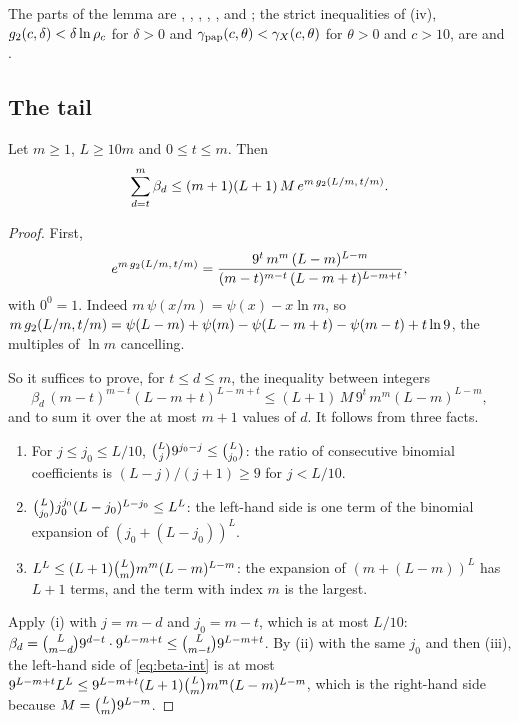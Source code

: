 The parts of the lemma are ,
, ,
, ,  and
; the strict inequalities of (iv), \(g_{2}(c,\delta)<\delta\ln\rho_c\)
for \(\delta>0\) and \(\gamma_{\mathrm{pap}}(c,\theta)<\gamma_{X}(c,\theta)\) for \(\theta>0\) and
\(c>10\), are  and .

\subsection{The tail}

\begin{theorem}\label{thm:tail}
Let \(m\ge1\), \(L\ge10m\) and \(0\le t\le m\).  Then
\[
  \sum_{d=t}^{m}\beta_d\le(m+1)(L+1)\,M\,e^{m\,g_{2}(L/m,\,t/m)} .
\]
\end{theorem}

\begin{proof}
First,
\begin{equation}\label{eq:exp-g2}
  e^{m\,g_{2}(L/m,\,t/m)}
  =\frac{9^{t}\,m^{m}\,(L-m)^{L-m}}{(m-t)^{m-t}\,(L-m+t)^{L-m+t}},
\end{equation}
with \(0^{0}=1\).  Indeed \(m\,\psi(x/m)=\psi(x)-x\ln m\), so
\(m\,g_{2}(L/m,t/m)=\psi(L-m)+\psi(m)-\psi(L-m+t)-\psi(m-t)+t\ln 9\), the
multiples of \(\ln m\) cancelling.

So it suffices to prove, for \(t\le d\le m\), the inequality between integers
\begin{equation}\label{eq:beta-int}
  \beta_d\,(m-t)^{m-t}(L-m+t)^{L-m+t}\le(L+1)\,M\,9^{t}\,m^{m}(L-m)^{L-m},
\end{equation}
and to sum it over the at most \(m+1\) values of \(d\).  It follows from three
facts.
\begin{enumerate}
\item For \(j\le j_0\le L/10\),
  \(\binom{L}{j}9^{j_0-j}\le\binom{L}{j_0}\): the ratio of consecutive
  binomial coefficients is \((L-j)/(j+1)\ge9\) for \(j<L/10\).
\item \(\binom{L}{j_0}j_0^{j_0}(L-j_0)^{L-j_0}\le L^{L}\): the left-hand side
  is one term of the binomial expansion of \((j_0+(L-j_0))^{L}\).
\item \(L^{L}\le(L+1)\binom{L}{m} m^{m}(L-m)^{L-m}\): the expansion of
  \((m+(L-m))^{L}\) has \(L+1\) terms, and the term with index \(m\) is the
  largest.
\end{enumerate}
Apply (i) with \(j=m-d\) and \(j_0=m-t\), which is at most \(L/10\):
\(\beta_d=\binom{L}{m-d}9^{d-t}\cdot9^{L-m+t}\le\binom{L}{m-t}9^{L-m+t}\).
By (ii) with the same \(j_0\) and then (iii), the left-hand side of
\eqref{eq:beta-int} is at most
\(9^{L-m+t}L^{L}\le9^{L-m+t}(L+1)\binom{L}{m} m^{m}(L-m)^{L-m}\), which is the
right-hand side because \(M=\binom{L}{m}9^{L-m}\).
\end{proof}

